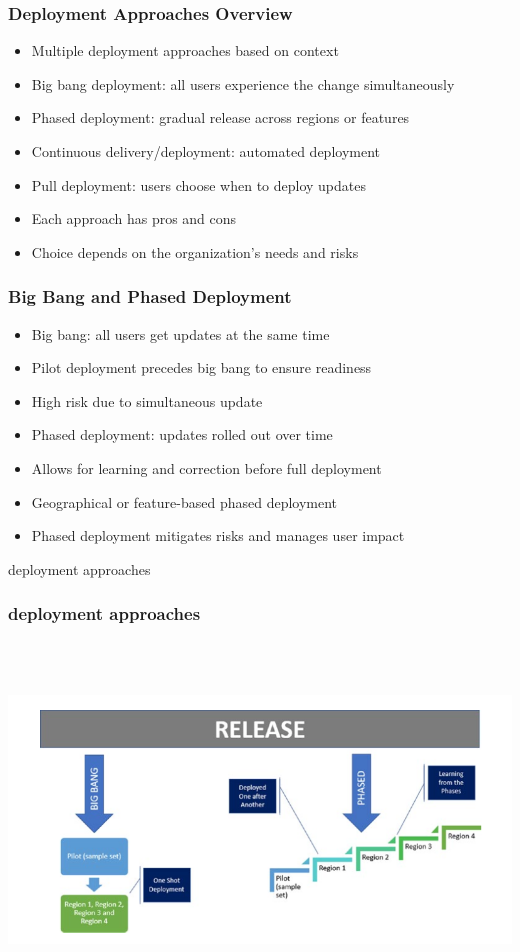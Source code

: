 \documentclass[aspectratio=169, table]{beamer}
\begin{document}
\begin{frame}
	\frametitle{Deployment Approaches Overview}
	\begin{itemize}
		\item Multiple deployment approaches based on context
		\item Big bang deployment: all users experience the change simultaneously
		\item Phased deployment: gradual release across regions or features
		\item Continuous delivery/deployment: automated deployment
		\item Pull deployment: users choose when to deploy updates
		\item Each approach has pros and cons
		\item Choice depends on the organization's needs and risks
	\end{itemize}
\end{frame}

\begin{frame}
	\frametitle{Big Bang and Phased Deployment}
	\begin{itemize}
		\item Big bang: all users get updates at the same time
		\item Pilot deployment precedes big bang to ensure readiness
		\item High risk due to simultaneous update
		\item Phased deployment: updates rolled out over time
		\item Allows for learning and correction before full deployment
		\item Geographical or feature-based phased deployment
		\item Phased deployment mitigates risks and manages user impact
	\end{itemize}
\end{frame}

\begin{frame}{deployment approaches} 	 \frametitle{deployment approaches} \begin{center} 	\includegraphics[width=0.6\linewidth]{images/image-05.png} \end{center} \end{frame}
\end{document}
